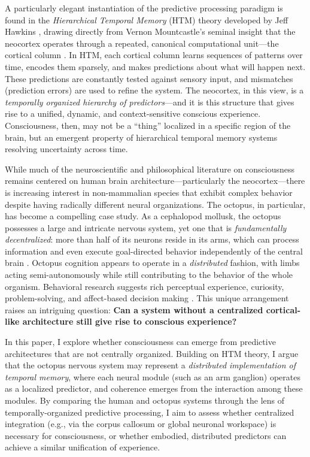 \documentclass[12pt]{article}
\begin{document}
A particularly elegant instantiation of the predictive processing paradigm is found in the \textit{Hierarchical Temporal Memory} (HTM) theory developed by Jeff Hawkins \cite{hawkins2004onintelligence}, drawing directly from Vernon Mountcastle’s seminal insight that the neocortex operates through a repeated, canonical computational unit—the cortical column \cite{mountcastle1978mindfulbrain}. In HTM, each cortical column learns sequences of patterns over time, encodes them sparsely, and makes predictions about what will happen next. These predictions are constantly tested against sensory input, and mismatches (prediction errors) are used to refine the system. The neocortex, in this view, is a \textit{temporally organized hierarchy of predictors}—and it is this structure that gives rise to a unified, dynamic, and context-sensitive conscious experience. Consciousness, then, may not be a ``thing'' localized in a specific region of the brain, but an emergent property of hierarchical temporal memory systems resolving uncertainty across time.

While much of the neuroscientific and philosophical literature on consciousness remains centered on human brain architecture—particularly the neocortex—there is increasing interest in non-mammalian species that exhibit complex behavior despite having radically different neural organizations. The octopus, in particular, has become a compelling case study. As a cephalopod mollusk, the octopus possesses a large and intricate nervous system, yet one that is \textit{fundamentally decentralized}: more than half of its neurons reside in its arms, which can process information and even execute goal-directed behavior independently of the central brain \cite{carls-diamante2022octopusconsciousness}. Octopus cognition appears to operate in a \textit{distributed} fashion, with limbs acting semi-autonomously while still contributing to the behavior of the whole organism. Behavioral research suggests rich perceptual experience, curiosity, problem-solving, and affect-based decision making \cite{mather2021octopusperception}. This unique arrangement raises an intriguing question: \textbf{Can a system without a centralized cortical-like architecture still give rise to conscious experience?}

In this paper, I explore whether consciousness can emerge from predictive architectures that are not centrally organized. Building on HTM theory, I argue that the octopus nervous system may represent a \textit{distributed implementation of temporal memory}, where each neural module (such as an arm ganglion) operates as a localized predictor, and coherence emerges from the interaction among these modules. By comparing the human and octopus systems through the lens of temporally-organized predictive processing, I aim to assess whether centralized integration (e.g., via the corpus callosum or global neuronal workspace) is necessary for consciousness, or whether embodied, distributed predictors can achieve a similar unification of experience.
\end{document}
